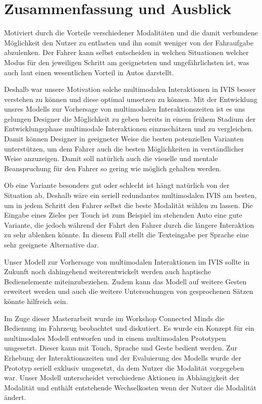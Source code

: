 \chapter{Zusammenfassung und Ausblick}\label{cha:Zusamenfassung}
Motiviert durch die Vorteile verschiedener Modalitäten und die damit verbundene Möglichkeit den Nutzer zu entlasten und ihn somit weniger von der Fahraufgabe abzulenken. Der Fahrer kann selbst entscheiden in welchen Situationen welcher Modus für den jeweiligen Schritt am geeignetsten und ungefährlichsten ist, was auch laut \citet{Muller_2011} einen wesentlichen Vorteil in Autos darstellt.

Deshalb war unsere Motivation solche multimodalen Interaktionen in IVIS besser verstehen zu können und diese optimal umsetzen zu können. Mit der Entwicklung unsres Modells zur Vorhersage von multimodalen Interaktionszeiten ist es uns gelungen Designer die Möglichkeit zu geben bereits in einem frühem Stadium der Entwicklungsphase multimodale Interaktionen einzuschätzen und zu vergleichen. Damit können Designer in geeigneter Weise die besten potenziellen Varianten unterstützen, um dem Fahrer auch die besten Möglichkeiten in verständlicher Weise anzuzeigen. Damit soll natürlich auch die visuelle und mentale Beanspruchung für den Fahrer so gering wie möglich gehalten werden. 

Ob eine Variante besonders gut oder schlecht ist hängt natürlich von der Situation ab, Deshalb wäre ein seriell redundantes multimodalen IVIS am besten, um in jedem Schritt den Fahrer selbst die beste Modalität wählen zu lassen. Die Eingabe eines Zieles per Touch ist zum Beispiel im stehenden Auto eine gute Variante, die jedoch während der Fahrt den Fahrer durch die längere Interaktion zu sehr ablenken könnte. In diesem Fall stellt die Texteingabe per Sprache eine sehr geeignete Alternative dar.

Unser Modell zur Vorhersage von multimodalen Interaktionen im IVIS sollte in Zukunft noch dahingehend weiterentwickelt werden auch haptische Bedienelemente miteinzubeziehen. Zudem kann das Modell auf weitere Gesten erweitert werden und auch die weitere Untersuchungen von gesprochenen Sätzen könnte hilfreich sein.

Im Zuge dieser Masterarbeit wurde im Workshop Connected Minds die Bedienung im Fahrzeug beobachtet und diskutiert. Es wurde ein Konzept für ein multimodales Modell entworfen und in einem multimodalen Prototypen umgesetzt. Dieser kann mit Touch, Sprache und Geste bedient werden. Zur Erhebung der Interaktionszeiten und der Evaluierung des Modells wurde der Prototyp seriell exklusiv umgesetzt, da dem Nutzer die Modalität vorgegeben war. Unser Modell unterscheidet verschiedene Aktionen in Abhängigkeit der Modalität und enthält entstehende Wechselkosten wenn der Nutzer die Modalität ändert. 
